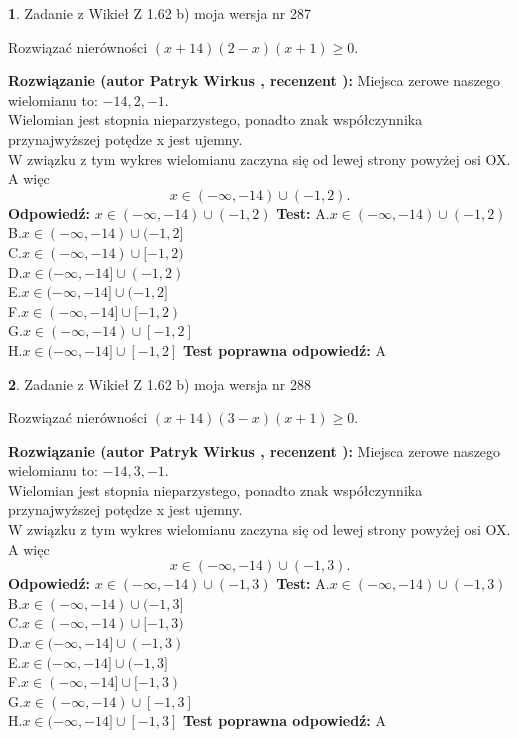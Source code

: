 \documentclass[12pt, a4paper]{article}
\theoremstyle{definition} %
\newtheorem{zad}{}
\newcommand{\zadStart}[1]{\begin{zad}#1\newline}
\newcommand{\zadStop}{\end{zad}}
\newcommand{\rozwStart}[2]{\noindent \textbf{Rozwiązanie (autor #1 , recenzent #2): }\newline}
\newcommand{\rozwStop}{\newline}
\newcommand{\odpStart}{\noindent \textbf{Odpowiedź:}\newline}
\newcommand{\odpStop}{\newline}
\newcommand{\testStart}{\noindent \textbf{Test:}\newline}
\newcommand{\testStop}{\newline}
\newcommand{\kluczStart}{\noindent \textbf{Test poprawna odpowiedź:}\newline}
\newcommand{\kluczStop}{\newline}
\begin{document}
\zadStart{Zadanie z Wikieł Z 1.62 b) moja wersja nr 287}

Rozwiązać nierówności $(x+14)(2-x)(x+1)\ge0$.
\zadStop
\rozwStart{Patryk Wirkus}{}
Miejsca zerowe naszego wielomianu to: $-14, 2, -1$.\\
Wielomian jest stopnia nieparzystego, ponadto znak współczynnika przy\linebreak najwyższej potędze x jest ujemny.\\ W związku z tym wykres wielomianu zaczyna się od lewej strony powyżej osi OX. A więc $$x \in (-\infty,-14) \cup (-1,2).$$
\rozwStop
\odpStart
$x \in (-\infty,-14) \cup (-1,2)$
\odpStop
\testStart
A.$x \in (-\infty,-14) \cup (-1,2)$\\
B.$x \in (-\infty,-14) \cup (-1,2]$\\
C.$x \in (-\infty,-14) \cup [-1,2)$\\
D.$x \in (-\infty,-14] \cup (-1,2)$\\
E.$x \in (-\infty,-14] \cup (-1,2]$\\
F.$x \in (-\infty,-14] \cup [-1,2)$\\
G.$x \in (-\infty,-14) \cup [-1,2]$\\
H.$x \in (-\infty,-14] \cup [-1,2]$
\testStop
\kluczStart
A
\kluczStop



\zadStart{Zadanie z Wikieł Z 1.62 b) moja wersja nr 288}

Rozwiązać nierówności $(x+14)(3-x)(x+1)\ge0$.
\zadStop
\rozwStart{Patryk Wirkus}{}
Miejsca zerowe naszego wielomianu to: $-14, 3, -1$.\\
Wielomian jest stopnia nieparzystego, ponadto znak współczynnika przy\linebreak najwyższej potędze x jest ujemny.\\ W związku z tym wykres wielomianu zaczyna się od lewej strony powyżej osi OX. A więc $$x \in (-\infty,-14) \cup (-1,3).$$
\rozwStop
\odpStart
$x \in (-\infty,-14) \cup (-1,3)$
\odpStop
\testStart
A.$x \in (-\infty,-14) \cup (-1,3)$\\
B.$x \in (-\infty,-14) \cup (-1,3]$\\
C.$x \in (-\infty,-14) \cup [-1,3)$\\
D.$x \in (-\infty,-14] \cup (-1,3)$\\
E.$x \in (-\infty,-14] \cup (-1,3]$\\
F.$x \in (-\infty,-14] \cup [-1,3)$\\
G.$x \in (-\infty,-14) \cup [-1,3]$\\
H.$x \in (-\infty,-14] \cup [-1,3]$
\testStop
\kluczStart
A
\kluczStop
\end{document}
